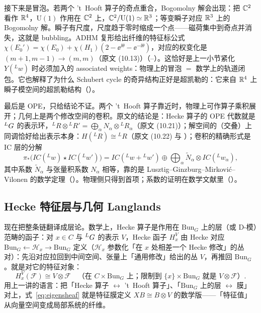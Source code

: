 接下来是冒泡。若两个 't~Hooft 算子的奇点重合，Bogomolny 解会出现：把 $\mathbb{C}^2$ 看作 $\mathbb{R}^4$，$\mathrm{U}(1)$ 作用在 $\mathbb{C}^2$ 上，$\mathbb{C}^2/\mathrm{U}(1)\simeq\mathbb{R}^3$；等变瞬子对应 $\mathbb{R}^3$ 上的 Bogomolny 解。瞬子有尺度，尺度趋于零时缩成一个点——磁荷集中到奇点并消失，这就是 bubbling。ADHM 复形给出纤维的特征标公式 $\chi(E_0')=\chi(E_0)+\chi(H_1)(2-\ee^{\ii\theta}-\ee^{-\ii\theta})$，对应的权变化是 $(m+1,m-1)\to(m,m)$（原文 (10.13)）（--）。这恰好是上一小节紧化 $Y({}^{L}w)$ 时必须加入的 associated weights：物理上的冒泡 $=$ 数学上的轨道闭包。它也解释了为什么 Schubert cycle 的奇异结构正好是超凯勒的：它来自 $\mathbb{R}^4$ 上瞬子模空间的超凯勒结构（）。

最后是 OPE，只给结论不证。两个 't~Hooft 算子靠近时，物理上可作算子乘积展开；几何上是两个修改空间的卷积。原文的结论是：Hecke 算子的 OPE 代数就是 ${}^{L}G$ 的表示环，${}^{L}R\otimes{}^{L}R'=\bigoplus_\alpha N_\alpha\otimes{}^{L}R_\alpha$（原文 (10.21)）；解空间的（交叠）上同调恰好给出表示本身：$H({}^{L}R)\cong{}^{L}R$（原文 (10.22) 与 ）；卷积的精确形式是 IC 层的分解
\begin{equation}
\pi_*\big(IC({}^{L}w)\star IC({}^{L}w')\big)=IC({}^{L}w+{}^{L}w')\oplus\bigoplus_\alpha \tilde N_\alpha\otimes IC({}^{L}w_\alpha),
\label{eq:convolution}
\end{equation}
其中系数 $\tilde N_\alpha$ 与张量积系数 $N_\alpha$ 相等，靠的是 Lusztig--Ginzburg--Mirkovi\'c--Vilonen 的数学定理（）。物理侧只得到首项；系数的证明在数学文献里（）。

\subsection{Hecke 特征层与几何 Langlands}

现在把整条链翻译成层论。数学上，Hecke 算子是作用在 $\mathrm{Bun}_G$ 上的层（或 D-模）范畴的函子：对 $x\in C$ 与 ${}^{L}G$ 的表示 $V$，Hecke 函子 $H_x^V$ 由 Hecke 对应 $\mathrm{Bun}_G\leftarrow \mathcal H_x\to\mathrm{Bun}_G$ 定义（$\mathcal H_x$ 参数化「在 $x$ 处相差一个 Hecke 修改」的丛对）：先沿对应拉回到中间空间、张量上「通用修改」给出的丛 $V$，再推回 $\mathrm{Bun}_G$。就是对它的特征对象：
\begin{equation}
H_x^V(\mathcal F)\cong V\otimes\mathcal F
\quad\text{（在 } C\times\mathrm{Bun}_G\text{ 上；限制到 }\{x\}\times\mathrm{Bun}_G\text{ 就是 }V\otimes\mathcal F\text{）}.
\label{eq:eigensheaf}
\end{equation}
用上一讲的语言：把「Hecke 算子 $\leftrightarrow$ 't~Hooft 算子」、「$\mathrm{Bun}_G$ 上的层 $\leftrightarrow$ 膜」对上，式~\eqref{eq:eigensheaf} 就是特征膜定义 $XB\cong B\otimes V$ 的数学版——「特征值」从向量空间变成局部系统的纤维。

